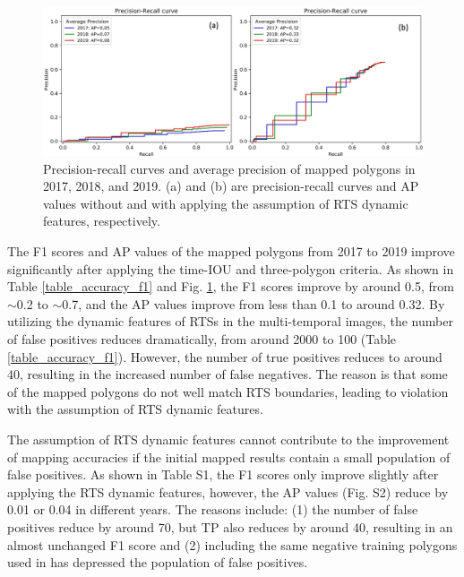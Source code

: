 \documentclass[authoryear,preprint,review,12pt]{elsarticle}
\begin{document}
\begin{figure} 
	\centering
	\includegraphics[width=14cm]{figs/exp7_p_r_curves_trim.jpg}
	\caption{Precision-recall curves and average precision of mapped polygons in 2017, 2018, and 2019. (a) and (b) are precision-recall curves and AP values without and with applying the assumption of RTS dynamic features, respectively.}
	\label{fig_p_r_curve_exp7}
\end{figure}


The F1 scores and AP values of the mapped polygons from 2017 to 2019 improve significantly after applying the time-IOU and three-polygon criteria. 
As shown in Table \ref{table_accuracy_f1} and Fig. \ref{fig_p_r_curve_exp7}, the F1 scores improve by around 0.5, from $\sim$0.2 to $\sim$0.7, and the AP values improve from less than 0.1 to around 0.32. 
By utilizing the dynamic features of RTSs in the multi-temporal images, the number of false positives reduces dramatically, from around 2000 to 100 (Table \ref{table_accuracy_f1}).
However, the number of true positives reduces to around 40, resulting in the increased number of false negatives. 
The reason is that some of the mapped polygons do not well match RTS boundaries, leading to violation with the assumption of RTS dynamic features. 
 
The assumption of RTS dynamic features cannot contribute to the improvement of mapping accuracies if the initial mapped results contain a small population of false positives. 
As shown in Table S1, the F1 scores only improve slightly after applying the RTS dynamic features, however, the AP values (Fig. S2) reduce by 0.01 or 0.04 in different years.   
The reasons include: (1) the number of false positives reduce by around 70, but TP also reduces by around 40, resulting in an almost unchanged F1 score 
and (2) including the same negative training polygons used in \cite{huang2020using} has depressed the population of false positives. 
\end{document}
